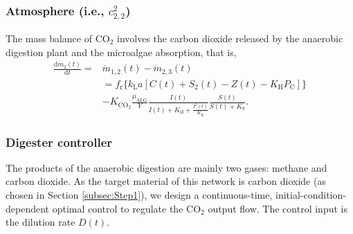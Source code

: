 \documentclass[lettersize,journal]{IEEEtran}
\begin{document}
\subsubsection{Atmosphere (i.e., $c^2_{2,2}$)}
The mass balance of $\text{CO}_2$ involves the carbon dioxide released by the anaerobic digestion plant and the microalgae absorption, that is, 
\begin{equation}\label{eq:AtmAccRate}
\begin{aligned}
\frac{\text{d}m_2(t)}{\text{d}t} = {} 
& \dot{m}_{1,2}(t) - \dot{m}_{2,3}(t) \\
& = f_\text{r}\{k_{\text{L}}a\left[C(t) + S_2(t) - Z(t) - K_{\text{H}}P_\text{C}\right]\} \\
& - K_{\text{CO}_2}\frac{\mu_{\text{ALG}}}{Y} \frac{I(t)}{I(t) + K_{\text{sI}} + \frac{I^2(t)}{K_{\text{iI}}}}\frac{S(t)}{S(t) + K_{\text{S}}}.
\end{aligned}  
\end{equation}













\subsubsection{Digester controller}
The products of the anaerobic digestion are mainly two gases: methane and carbon dioxide. As the target material of this network is carbon dioxide (as chosen in Section \ref{subsec:Step1}), we design a continuous-time, initial-condition-dependent optimal control to regulate the $\text{CO}_2$ output flow. The control input is the dilution rate $D(t)$. 
\end{document}
